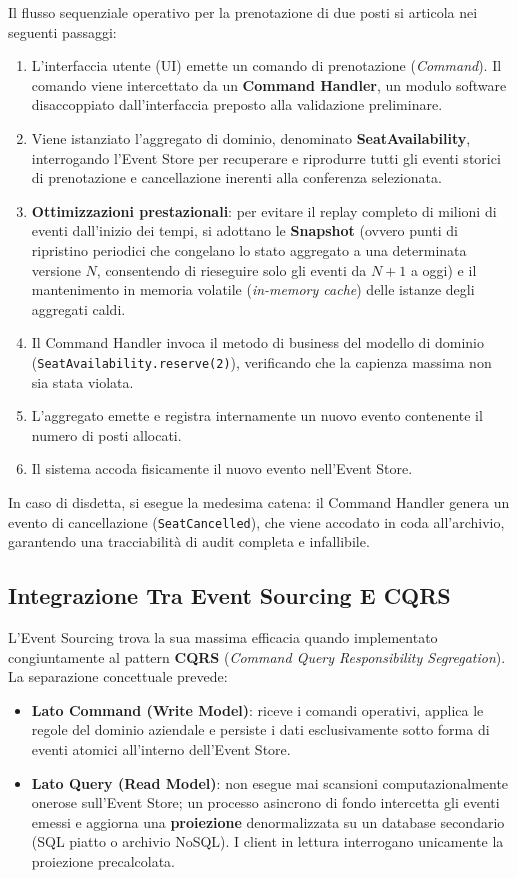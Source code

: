 \documentclass[11pt, a4paper]{article}
\begin{document}
Il flusso sequenziale operativo per la prenotazione di due posti si articola nei seguenti passaggi:
\begin{enumerate}[noitemsep]
    \item L'interfaccia utente (UI) emette un comando di prenotazione (\emph{Command}). Il comando viene intercettato da un \textbf{Command Handler}, un modulo software disaccoppiato dall'interfaccia preposto alla validazione preliminare.
    \item Viene istanziato l'aggregato di dominio, denominato \textbf{SeatAvailability}, interrogando l'Event Store per recuperare e riprodurre tutti gli eventi storici di prenotazione e cancellazione inerenti alla conferenza selezionata.
    \item \textbf{Ottimizzazioni prestazionali}: per evitare il replay completo di milioni di eventi dall'inizio dei tempi, si adottano le \textbf{Snapshot} (ovvero punti di ripristino periodici che congelano lo stato aggregato a una determinata versione $N$, consentendo di rieseguire solo gli eventi da $N+1$ a oggi) e il mantenimento in memoria volatile (\emph{in-memory cache}) delle istanze degli aggregati caldi.
    \item Il Command Handler invoca il metodo di business del modello di dominio (\texttt{SeatAvailability.reserve(2)}), verificando che la capienza massima non sia stata violata.
    \item L'aggregato emette e registra internamente un nuovo evento contenente il numero di posti allocati.
    \item Il sistema accoda fisicamente il nuovo evento nell'Event Store.
\end{enumerate}
In caso di disdetta, si esegue la medesima catena: il Command Handler genera un evento di cancellazione (\texttt{SeatCancelled}), che viene accodato in coda all'archivio, garantendo una tracciabilità di audit completa e infallibile.

\subsection{Integrazione Tra Event Sourcing E CQRS}

L'Event Sourcing trova la sua massima efficacia quando implementato congiuntamente al pattern \textbf{CQRS} (\emph{Command Query Responsibility Segregation}). La separazione concettuale prevede:
\begin{itemize}
    \item \textbf{Lato Command (Write Model)}: riceve i comandi operativi, applica le regole del dominio aziendale e persiste i dati esclusivamente sotto forma di eventi atomici all'interno dell'Event Store.
    \item \textbf{Lato Query (Read Model)}: non esegue mai scansioni computazionalmente onerose sull'Event Store; un processo asincrono di fondo intercetta gli eventi emessi e aggiorna una \textbf{proiezione} denormalizzata su un database secondario (SQL piatto o archivio NoSQL). I client in lettura interrogano unicamente la proiezione precalcolata.
\end{itemize}
\end{document}
